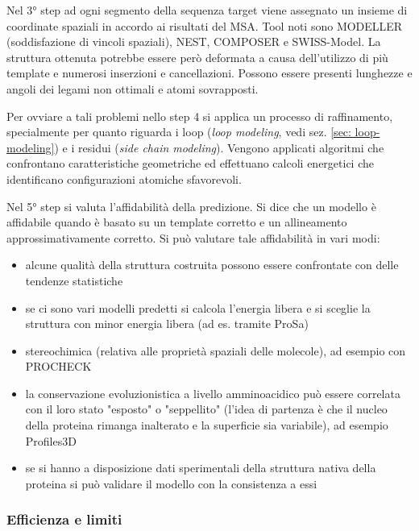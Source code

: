 {	\par Nel 3° step ad ogni segmento della sequenza target viene assegnato un insieme di coordinate spaziali in accordo ai risultati del MSA. Tool noti sono MODELLER (soddisfazione di vincoli spaziali), NEST, COMPOSER e SWISS-Model. La struttura ottenuta potrebbe essere però deformata a causa dell'utilizzo di più template e numerosi inserzioni e cancellazioni. Possono essere presenti lunghezze e angoli dei legami non ottimali e atomi sovrapposti.
	
	\par Per ovviare a tali problemi nello step 4 si applica un processo di raffinamento, specialmente per quanto riguarda i loop (\textit{loop modeling}, vedi sez. \ref{sec: loop-modeling}) e i residui (\textit{side chain modeling}). Vengono applicati algoritmi che confrontano caratteristiche geometriche ed effettuano calcoli energetici che identificano configurazioni atomiche sfavorevoli. 
	
	\par Nel 5° step si valuta l'affidabilità della predizione. Si dice che un modello è affidabile quando è basato su un template corretto e un allineamento approssimativamente corretto. Si può valutare tale affidabilità in vari modi:
	
	\begin{itemize}
		\item alcune qualità della struttura costruita possono essere confrontate con delle tendenze statistiche 
		\item se ci sono vari modelli predetti si calcola l'energia libera e si sceglie la struttura con minor energia libera (ad es. tramite ProSa)
		\item stereochimica (relativa alle proprietà spaziali delle molecole), ad esempio con PROCHECK
		\item la conservazione evoluzionistica a livello amminoacidico può essere correlata con il loro stato "esposto" o "seppellito" (l'idea di partenza è che il nucleo della proteina rimanga inalterato e la superficie sia variabile), ad esempio Profiles3D
		\item se si hanno a disposizione dati sperimentali della struttura nativa della proteina si può validare il modello con la consistenza a essi
	\end{itemize}
	
	\subsubsection{Efficienza e limiti}
	
}
